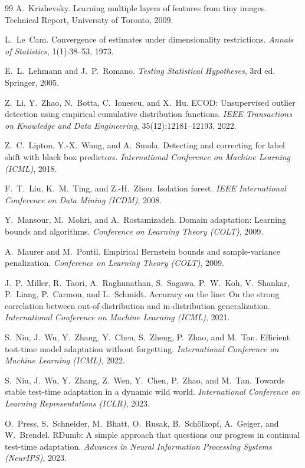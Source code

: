 \begin{thebibliography}{99}
A.~Krizhevsky.
Learning multiple layers of features from tiny images.
Technical Report, University of Toronto, 2009.

L.~Le~Cam.
Convergence of estimates under dimensionality restrictions.
\textit{Annals of Statistics}, 1(1):38--53, 1973.

E.~L.~Lehmann and J.~P.~Romano.
\textit{Testing Statistical Hypotheses}, 3rd ed.
Springer, 2005.

Z.~Li, Y.~Zhao, N.~Botta, C.~Ionescu, and X.~Hu.
ECOD: Unsupervised outlier detection using empirical cumulative
distribution functions.
\textit{IEEE Transactions on Knowledge and Data Engineering}, 35(12):12181--12193, 2022.

Z.~C.~Lipton, Y.-X.~Wang, and A.~Smola.
Detecting and correcting for label shift with black box predictors.
\textit{International Conference on Machine Learning (ICML)}, 2018.

F.~T.~Liu, K.~M.~Ting, and Z.-H.~Zhou.
Isolation forest.
\textit{IEEE International Conference on Data Mining (ICDM)}, 2008.

Y.~Mansour, M.~Mohri, and A.~Rostamizadeh.
Domain adaptation: Learning bounds and algorithms.
\textit{Conference on Learning Theory (COLT)}, 2009.

A.~Maurer and M.~Pontil.
Empirical Bernstein bounds and sample-variance penalization.
\textit{Conference on Learning Theory (COLT)}, 2009.

J.~P.~Miller, R.~Taori, A.~Raghunathan, S.~Sagawa, P.~W.~Koh, V.~Shankar,
P.~Liang, P.~Carmon, and L.~Schmidt.
Accuracy on the line: On the strong correlation between out-of-distribution and
in-distribution generalization.
\textit{International Conference on Machine Learning (ICML)}, 2021.

S.~Niu, J.~Wu, Y.~Zhang, Y.~Chen, S.~Zheng, P.~Zhao, and M.~Tan.
Efficient test-time model adaptation without forgetting.
\textit{International Conference on Machine Learning (ICML)}, 2022.

S.~Niu, J.~Wu, Y.~Zhang, Z.~Wen, Y.~Chen, P.~Zhao, and M.~Tan.
Towards stable test-time adaptation in a dynamic wild world.
\textit{International Conference on Learning Representations (ICLR)}, 2023.

O.~Press, S.~Schneider, M.~Bhatt, O.~Rusak, B.~Sch\"olkopf, A.~Geiger,
and W.~Brendel.
RDumb: A simple approach that questions our progress in continual test-time
adaptation.
\textit{Advances in Neural Information Processing Systems (NeurIPS)}, 2023.


\end{thebibliography}
